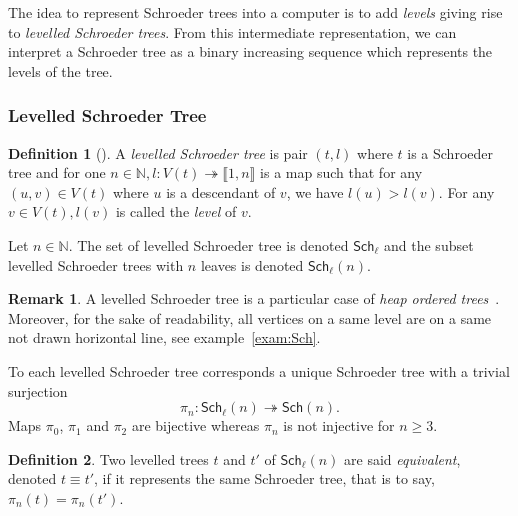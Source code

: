 \documentclass[a4paper,10pt]{amsart}
\newcommand\Sch{\mathsf{Sch}}
\newcommand\Schl{\mathsf{Sch}_\ell}
\newcommand\nn{n}
\newcommand\NN{\mathbb{N}}
\newcommand{\IEM}[2]{\llbracket #1,#2 \rrbracket}
\newcommand{\Schw}{Schroeder} %
\theoremstyle{definition}
\newtheorem{defi}{Definition}
\newtheorem{Rq}{Remark}
\begin{document}
The idea to represent \Schw{} trees into a computer is to add \emph{levels} giving rise to \emph{levelled \Schw{} trees}. From this intermediate representation, we can interpret a \Schw{} tree as a binary increasing sequence which represents the levels of the tree.

\subsubsection{Levelled Schroeder Tree}

\begin{defi}[\cite{Palacios_06}] \label{defi:levelled_trees}
	A \emph{levelled \Schw{} tree} is pair $(t,l)$ where $t$ is a \Schw{} tree and for one $n\in\NN,l:V(t)\twoheadrightarrow \IEM{1}{n}$ is a map such that for any $(u,v)\in V(t)$ where $u$ is a descendant of $v$, we have $l(u)>l(v)$. For any $v\in V(t), l(v)$ is called the \emph{level} of $v$. 
	
	Let $n\in\NN.$
	The set of levelled \Schw{} tree is denoted $\Schl$ and the subset levelled \Schw{} trees with $n$ leaves is denoted $\Schl(\nn)$.
\end{defi}
\begin{Rq}
	A levelled \Schw{} tree is a particular case of \emph{heap ordered trees}~\cite[example 2.3]{Grossman_89}. Moreover, for the sake of readability, all vertices on a same level are on a same not drawn horizontal line, see example~\ref{exam:Sch}.
\end{Rq}

To each levelled \Schw{} tree corresponds a unique Schroeder tree with a trivial surjection
\begin{equation}
	\pi_\nn:\Schl(\nn)\twoheadrightarrow\Sch(\nn).
\end{equation}
Maps $\pi_0$, $\pi_1$ and $\pi_2$ are bijective whereas $\pi_\nn$ is not injective for $n\geq 3$.

\begin{defi}
	Two levelled trees $t$ and $t'$ of $\Schl(\nn)$ are said \emph{equivalent}, denoted $t\equiv t'$, if it represents the same Schroeder tree, that is to say, $\pi_\nn(t)=\pi_\nn(t')$.
\end{defi}
\end{document}

